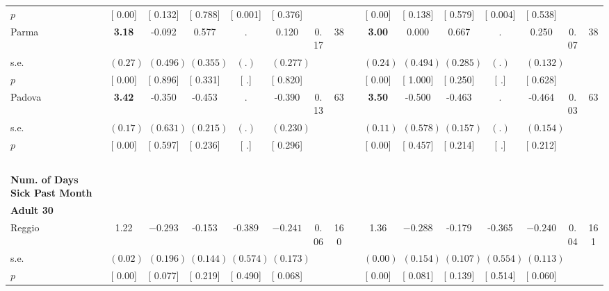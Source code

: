 \begin{longtable}{L{8em} c c c c c c c p{1em} c c c c c c c}
\quad \quad \quad \quad $ p$ & [     0.00] & [    0.132] & [    0.788] & [    0.001] & [    0.376] & & & & [     0.00] & [    0.138] & [    0.579] & [    0.004] & [    0.538] & &  \\[1em]
\quad \quad \quad Parma& \textbf{     3.18} &    -0.092 &     0.577 &         . &     0.120 &      0.17 &        38 & & \textbf{     3.00} &     0.000 &     0.667 &         . &     0.250 &      0.07 &        38  \\*
\quad \quad \quad \quad s.e.& $ (     0.27)$ & $ (    0.496)$ & $ (    0.355)$ & $ (        .)$ & $ (    0.277)$ & & & & $ (     0.24)$ & $ (    0.494)$ & $ (    0.285)$ & $ (        .)$ & $ (    0.132)$ & &  \\*
\quad \quad \quad \quad $ p$ & [     0.00] & [    0.896] & [    0.331] & [        .] & [    0.820] & & & & [     0.00] & [    1.000] & [    0.250] & [        .] & [    0.628] & &  \\[1em]
\quad \quad \quad Padova& \textbf{     3.42} &    -0.350 &    -0.453 &         . &    -0.390 &      0.13 &        63 & & \textbf{     3.50} &    -0.500 &    -0.463 &         . &    -0.464 &      0.03 &        63  \\*
\quad \quad \quad \quad s.e.& $ (     0.17)$ & $ (    0.631)$ & $ (    0.215)$ & $ (        .)$ & $ (    0.230)$ & & & & $ (     0.11)$ & $ (    0.578)$ & $ (    0.157)$ & $ (        .)$ & $ (    0.154)$ & &  \\*
\quad \quad \quad \quad $ p$ & [     0.00] & [    0.597] & [    0.236] & [        .] & [    0.296] & & & & [     0.00] & [    0.457] & [    0.214] & [        .] & [    0.212] & &  \\[1em]
~\\[1em]
\textbf{Num. of Days Sick Past Month} \\*
\quad \quad \textbf{Adult 30} & & & & & & & & & & & & & & & \\* 
\quad \quad \quad Reggio& 1.22 & $ \mathbf{   -0.293}$ &    -0.153 &    -0.389 & $ \mathbf{   -0.241}$ &      0.06 &       160 & & 1.36 & $ \mathbf{   -0.288}$ &    -0.179 &    -0.365 & $ \mathbf{   -0.240}$ &      0.04 &       161  \\*
\quad \quad \quad \quad s.e.& $ (     0.02)$ & $ (    0.196)$ & $ (    0.144)$ & $ (    0.574)$ & $ (    0.173)$ & & & & $ (     0.00)$ & $ (    0.154)$ & $ (    0.107)$ & $ (    0.554)$ & $ (    0.113)$ & &  \\*
\quad \quad \quad \quad $ p$ & [     0.00] & [    0.077] & [    0.219] & [    0.490] & [    0.068] & & & & [     0.00] & [    0.081] & [    0.139] & [    0.514] & [    0.060] & &  \\[1em]

\end{longtable}
